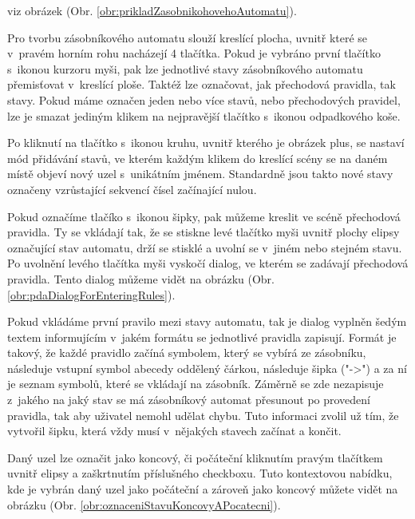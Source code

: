 viz obrázek (Obr. \ref{obr:prikladZasobnikohovehoAutomatu}). 


Pro tvorbu zásobníkového automatu slouží kreslící plocha, uvnitř které se v~pravém horním rohu nacházejí 4 tlačítka. Pokud je vybráno první tlačítko s~ikonou kurzoru myši, pak lze jednotlivé stavy zásobníkového automatu přemisťovat v~kreslící ploše. Taktéž lze označovat, jak přechodová pravidla, tak stavy. Pokud máme označen jeden nebo více stavů, nebo přechodových pravidel, lze je smazat jediným klikem na nejpravější tlačítko s~ikonou odpadkového koše.

Po kliknutí na tlačítko s~ikonou kruhu, uvnitř kterého je obrázek plus, se nastaví mód přidávání stavů, ve kterém každým klikem do kreslící scény se na daném místě objeví nový uzel s~unikátním jménem. Standardně jsou takto nové stavy označeny vzrůstající sekvencí čísel začínající nulou.

Pokud označíme tlačíko s~ikonou šipky, pak můžeme kreslit ve scéně přechodová pravidla. Ty se vkládají tak, že se stiskne levé tlačítko myši uvnitř plochy elipsy označující stav automatu, drží se stisklé a uvolní se v~jiném nebo stejném stavu. Po uvolnění levého tlačítka myši vyskočí dialog, ve kterém se zadávají přechodová pravidla. Tento dialog můžeme vidět na obrázku (Obr. \ref{obr:pdaDialogForEnteringRules}). 


Pokud vkládáme první pravilo mezi stavy automatu, tak je dialog vyplněn šedým textem informujícím v~jakém formátu se jednotlivé pravidla zapisují.
Formát je takový, že každé pravidlo začíná symbolem, který se vybírá ze zásobníku, následuje vstupní symbol abecedy oddělený čárkou, následuje šipka ("->") a za ní je seznam symbolů, které se vkládají na zásobník. Záměrně se zde nezapisuje z~jakého na jaký stav se má zásobníkový automat přesunout po provedení pravidla, tak aby uživatel nemohl udělat chybu. Tuto informaci zvolil už tím, že vytvořil šipku, která vždy musí v~nějakých stavech začínat a končit.

Daný uzel lze označit jako koncový, či počáteční kliknutím pravým tlačítkem uvnitř elipsy a zaškrtnutím příslušného checkboxu. Tuto kontextovou nabídku, kde je vybrán daný uzel jako počáteční a zároveň jako koncový můžete vidět na obrázku (Obr. \ref{obr:oznaceniStavuKoncovyAPocatecni}).

